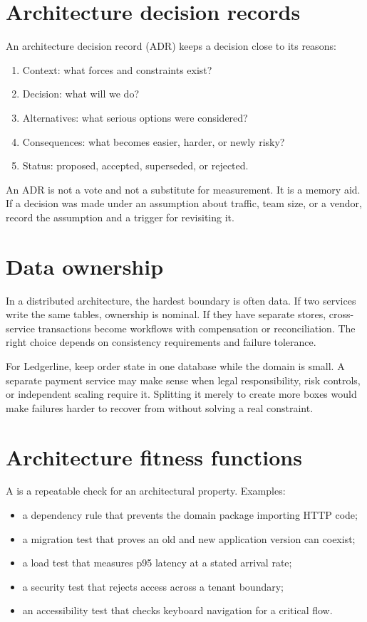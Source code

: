 \section{Architecture decision records}
An architecture decision record (ADR) keeps a decision close to its reasons:

\begin{enumerate}
  \item Context: what forces and constraints exist?
  \item Decision: what will we do?
  \item Alternatives: what serious options were considered?
  \item Consequences: what becomes easier, harder, or newly risky?
  \item Status: proposed, accepted, superseded, or rejected.
\end{enumerate}

An ADR is not a vote and not a substitute for measurement. It is a memory aid.
If a decision was made under an assumption about traffic, team size, or a vendor,
record the assumption and a trigger for revisiting it.

\section{Data ownership}
In a distributed architecture, the hardest boundary is often data. If two
services write the same tables, ownership is nominal. If they have separate
stores, cross-service transactions become workflows with compensation or
reconciliation. The right choice depends on consistency requirements and
failure tolerance.

For Ledgerline, keep order state in one database while the domain is small. A
separate payment service may make sense when legal responsibility, risk controls,
or independent scaling require it. Splitting it merely to create more boxes
would make failures harder to recover from without solving a real constraint.

\section{Architecture fitness functions}
A  is a repeatable check for an architectural property.
Examples:

\begin{itemize}
  \item a dependency rule that prevents the domain package importing HTTP code;
  \item a migration test that proves an old and new application version can coexist;
  \item a load test that measures p95 latency at a stated arrival rate;
  \item a security test that rejects access across a tenant boundary;
  \item an accessibility test that checks keyboard navigation for a critical flow.
\end{itemize}

